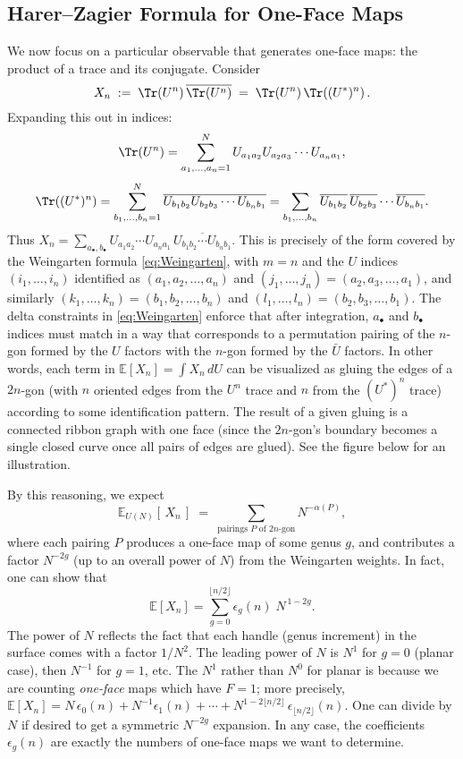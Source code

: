 \documentclass[letterpaper,11pt,oneside,reqno]{article}
\numberwithin{equation}{section}
\theoremstyle{definition}
\begin{document}
\subsection*{Harer–Zagier Formula for One-Face Maps}

We now focus on a particular observable that generates one-face maps: the product of a trace and its conjugate. Consider
\[ X_n \;:=\; \Tr(U^n)\,\overline{\Tr(U^n)} \;=\; \Tr(U^n)\,\Tr((U^*)^n)\,. \]
Expanding this out in indices:
\[ \Tr(U^n) = \sum_{a_1,\dots,a_n=1}^N U_{a_1 a_2} U_{a_2 a_3}\cdots U_{a_n a_1}, \]
\[ \Tr((U^*)^n) = \sum_{b_1,\dots,b_n=1}^N \overline{U_{b_1 b_2} U_{b_2 b_3}\cdots U_{b_n b_1}} = \sum_{b_1,\dots,b_n} \overline{U_{b_1 b_2}}\,\overline{U_{b_2 b_3}}\cdots \overline{U_{b_n b_1}}. \]
Thus $X_n = \sum_{a_\bullet,b_\bullet} U_{a_1 a_2}\cdots U_{a_n a_1}\,\overline{U_{b_1 b_2}\cdots U_{b_n b_1}}$. This is precisely of the form covered by the Weingarten formula \eqref{eq:Weingarten}, with $m=n$ and the $U$ indices $(i_1,\dots,i_n)$ identified as $(a_1,a_2,\dots,a_n)$ and $(j_1,\dots,j_n)=(a_2,a_3,\dots,a_1)$, and similarly $(k_1,\dots,k_n)=(b_1,b_2,\dots,b_n)$ and $(l_1,\dots,l_n)=(b_2,b_3,\dots,b_1)$. The delta constraints in \eqref{eq:Weingarten} enforce that after integration, $a_\bullet$ and $b_\bullet$ indices must match in a way that corresponds to a permutation pairing of the $n$-gon formed by the $U$ factors with the $n$-gon formed by the $\bar U$ factors. In other words, each term in $\mathbb{E}[X_n] = \int X_n\,dU$ can be visualized as gluing the edges of a $2n$-gon (with $n$ oriented edges from the $U^n$ trace and $n$ from the $(U^*)^n$ trace) according to some identification pattern. The result of a given gluing is a connected ribbon graph with one face (since the $2n$-gon's boundary becomes a single closed curve once all pairs of edges are glued). See the figure below for an illustration.

By this reasoning, we expect
\[ \mathbb{E}_{U(N)}[\,X_n\,] \;=\; \sum_{\text{pairings }P \text{ of }2n\text{-gon}} N^{-\alpha(P)}, \]
where each pairing $P$ produces a one-face map of some genus $g$, and contributes a factor $N^{-2g}$ (up to an overall power of $N$) from the Weingarten weights. In fact, one can show that
\[ \mathbb{E}[X_n] = \sum_{g=0}^{\lfloor n/2\rfloor} \epsilon_g(n)\; N^{\,1-2g}. \]
The power of $N$ reflects the fact that each handle (genus increment) in the surface comes with a factor $1/N^2$. The leading power of $N$ is $N^1$ for $g=0$ (planar case), then $N^{-1}$ for $g=1$, etc. The $N^1$ rather than $N^0$ for planar is because we are counting \emph{one-face} maps which have $F=1$; more precisely, $\mathbb{E}[X_n] = N\,\epsilon_0(n) + N^{-1}\epsilon_1(n) + \cdots + N^{1-2\lfloor n/2\rfloor}\,\epsilon_{\lfloor n/2\rfloor}(n)$. One can divide by $N$ if desired to get a symmetric $N^{ -2g}$ expansion. In any case, the coefficients $\epsilon_g(n)$ are exactly the numbers of one-face maps we want to determine.
\end{document}

